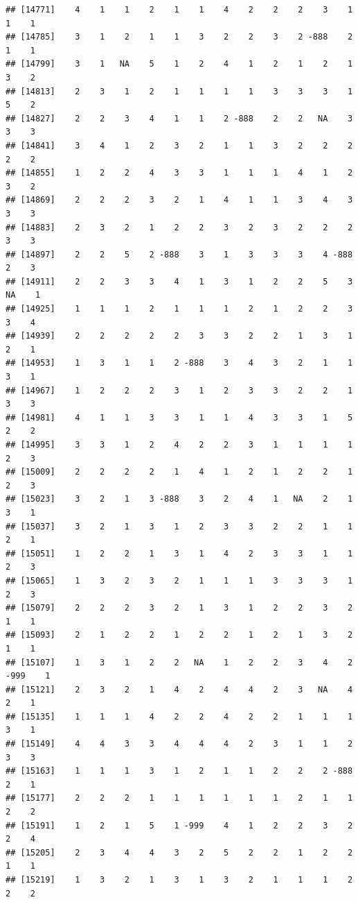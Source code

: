 \documentclass[
  12pt,
  openany]{book}
\begin{document}
\begin{verbatim}
## [14771]    4    1    1    2    1    1    4    2    2    2    3    1    1    1
## [14785]    3    1    2    1    1    3    2    2    3    2 -888    2    1    1
## [14799]    3    1   NA    5    1    2    4    1    2    1    2    1    3    2
## [14813]    2    3    1    2    1    1    1    1    3    3    3    1    5    2
## [14827]    2    2    3    4    1    1    2 -888    2    2   NA    3    3    3
## [14841]    3    4    1    2    3    2    1    1    3    2    2    2    2    2
## [14855]    1    2    2    4    3    3    1    1    1    4    1    2    3    2
## [14869]    2    2    2    3    2    1    4    1    1    3    4    3    3    3
## [14883]    2    3    2    1    2    2    3    2    3    2    2    2    3    3
## [14897]    2    2    5    2 -888    3    1    3    3    3    4 -888    2    3
## [14911]    2    2    3    3    4    1    3    1    2    2    5    3   NA    1
## [14925]    1    1    1    2    1    1    1    2    1    2    2    3    3    4
## [14939]    2    2    2    2    2    3    3    2    2    1    3    1    2    1
## [14953]    1    3    1    1    2 -888    3    4    3    2    1    1    3    1
## [14967]    1    2    2    2    3    1    2    3    3    2    2    1    3    3
## [14981]    4    1    1    3    3    1    1    4    3    3    1    5    2    2
## [14995]    3    3    1    2    4    2    2    3    1    1    1    1    2    3
## [15009]    2    2    2    2    1    4    1    2    1    2    2    1    2    3
## [15023]    3    2    1    3 -888    3    2    4    1   NA    2    1    3    1
## [15037]    3    2    1    3    1    2    3    3    2    2    1    1    2    1
## [15051]    1    2    2    1    3    1    4    2    3    3    1    1    2    3
## [15065]    1    3    2    3    2    1    1    1    3    3    3    1    2    3
## [15079]    2    2    2    3    2    1    3    1    2    2    3    2    1    1
## [15093]    2    1    2    2    1    2    2    1    2    1    3    2    1    1
## [15107]    1    3    1    2    2   NA    1    2    2    3    4    2 -999    1
## [15121]    2    3    2    1    4    2    4    4    2    3   NA    4    2    1
## [15135]    1    1    1    4    2    2    4    2    2    1    1    1    3    1
## [15149]    4    4    3    3    4    4    4    2    3    1    1    2    3    3
## [15163]    1    1    1    3    1    2    1    1    2    2    2 -888    2    1
## [15177]    2    2    2    1    1    1    1    1    1    2    1    1    2    2
## [15191]    1    2    1    5    1 -999    4    1    2    2    3    2    2    4
## [15205]    2    3    4    4    3    2    5    2    2    1    2    2    1    1
## [15219]    1    3    2    1    3    1    3    2    1    1    1    2    2    2

\end{verbatim}
\end{document}
